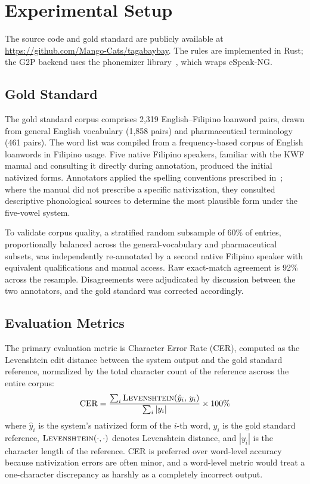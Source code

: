 \section{Experimental Setup}
The source code and gold standard are publicly available at
\url{https://github.com/Mango-Cats/tagabaybay}. The rules are implemented in Rust; the G2P backend uses the phonemizer
library~\cite{bernard2021}, which wraps eSpeak-NG.

\subsection{Gold Standard}

The gold standard corpus comprises 2,319 English--Filipino loanword pairs,
drawn from general English vocabulary (1,858 pairs) and pharmaceutical
terminology (461 pairs). The word list was compiled from a frequency-based
corpus of English loanwords in Filipino usage. Five native Filipino speakers,
familiar with the KWF manual and consulting it directly during annotation,
produced the initial nativized forms. Annotators applied the spelling
conventions prescribed in~\cite{almario2014}; where the manual did not
prescribe a specific nativization, they consulted descriptive phonological
sources to determine the most plausible form under the five-vowel system.

To validate corpus quality, a stratified random subsample of 60\% of entries,
proportionally balanced across the general-vocabulary and pharmaceutical
subsets, was independently re-annotated by a second native Filipino speaker
with equivalent qualifications and manual access. Raw exact-match agreement is
92\% across the resample. Disagreements were adjudicated by discussion between
the two annotators, and the gold standard was corrected accordingly.

\subsection{Evaluation Metrics}\label{ssec:evaluation_metrics}

The primary evaluation metric is Character Error Rate (CER), computed as the
Levenshtein edit distance between the system output and the gold standard
reference, normalized by the total character count of the reference ascross the
entire corpus:
\begin{equation}
    \text{CER} = \frac{\sum_{i} \textsc{Levenshtein}(\hat{y}_i,\, y_i)}
    {\sum_{i} |y_i|}
    \times 100\%
\end{equation}
where \(\hat{y}_i\) is the system's nativized form of the \(i\)-th word,
\(y_i\) is the gold standard reference, \(\textsc{Levenshtein}(\cdot,\cdot)\) denotes
Levenshtein distance, and \(|y_i|\) is the character length of
the reference. CER is preferred over word-level accuracy because nativization
errors are often minor, and a word-level metric would treat a one-character
discrepancy as harshly as a completely incorrect output.

